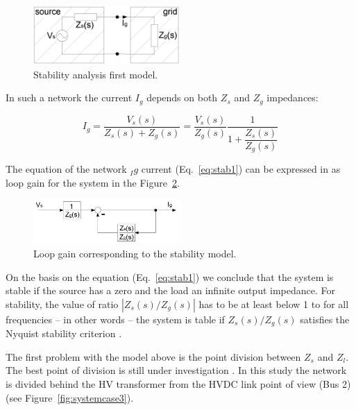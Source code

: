 \documentclass[12pt]{report} %
\begin{document}
\begin{figure}[htb]
	\centering
    	\includegraphics[width=0.5\textwidth]{img/theory/stability_model1.png}
  	\caption{Stability analysis first model.}
  	\label{fig:stabilitymodel1}
\end{figure}
\FloatBarrier

In such a network the current $I_g$ depends on both $Z_s$ and $Z_g$ impedances:

\begin{equation} \label{eq:stab1}
	I_g=\dfrac{V_s (s)}{Z_s (s)+Z_g (s)}=\dfrac{V_s (s)}{Z_g (s)} \dfrac{1}{1+\dfrac{Z_s (s)}{Z_g (s)}}
\end{equation}

The equation of the network $_Ig$ current (Eq.~\ref{eq:stab1}) can be expressed in as loop gain for the system in the Figure~\ref{fig:stabilityloop}.

\begin{figure}[htb]
	\centering
    	\includegraphics[width=0.5\textwidth]{img/theory/stability_loop.png}
  	\caption{Loop gain corresponding to the stability model.}
  	\label{fig:stabilityloop}
\end{figure}
\FloatBarrier

On the basis on the equation (Eq.~\ref{eq:stab1}) we conclude that the system is stable if the source has a zero and the load an infinite output impedance. For stability, the value of ratio $|Z_s (s)/Z_g (s)|$ has to be at least below 1 to for all frequencies \cite{sun2011} – in other words – the system is table if  $Z_s (s)/Z_g (s)$ satisfies the Nyquist stability criterion \cite{middlebrook1976}.

The first problem with the model above is the point division between $Z_s$ and $Z_l$. The best point of division is still under investigation \cite{borwin1}. In this study the network is divided behind the HV transformer from the HVDC link point of view (Bus 2) (see Figure~\ref{fig:systemcase3}).
\end{document}
